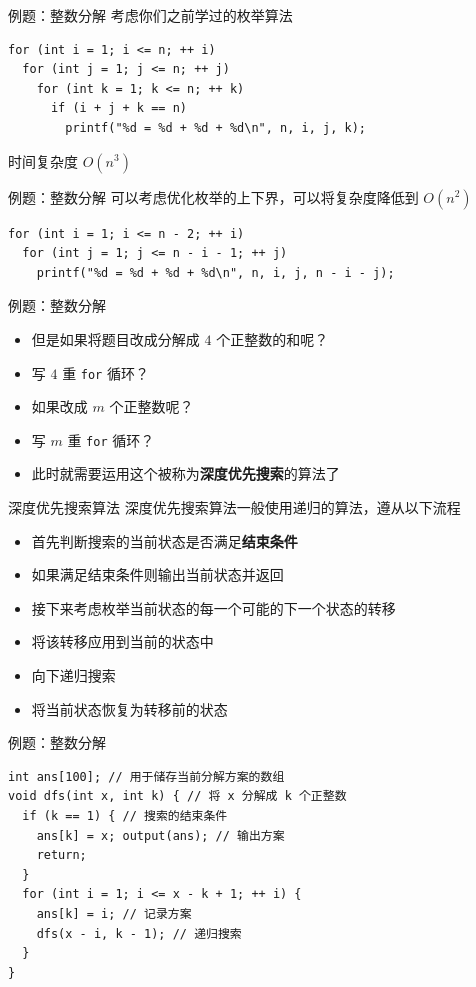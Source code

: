 \documentclass[12pt,aspectratio=169]{beamer}
\begin{document}
\begin{frame}[fragile]{例题：整数分解}
  考虑你们之前学过的枚举算法
  \begin{verbatim}
for (int i = 1; i <= n; ++ i)
  for (int j = 1; j <= n; ++ j)
    for (int k = 1; k <= n; ++ k)
      if (i + j + k == n)
        printf("%d = %d + %d + %d\n", n, i, j, k);
  \end{verbatim}
  \pause
  时间复杂度 $O(n^3)$
\end{frame}

\begin{frame}[fragile]{例题：整数分解}
  可以考虑优化枚举的上下界，可以将复杂度降低到 $O(n^2)$
  \begin{verbatim}
for (int i = 1; i <= n - 2; ++ i)
  for (int j = 1; j <= n - i - 1; ++ j)
    printf("%d = %d + %d + %d\n", n, i, j, n - i - j);
  \end{verbatim}
\end{frame}

\begin{frame}[fragile]{例题：整数分解}
  \begin{itemize}
    \item 但是如果将题目改成分解成 $4$ 个正整数的和呢？\pause
    \item 写 $4$ 重 \verb|for| 循环？\pause
    \item 如果改成 $m$ 个正整数呢？\pause
    \item 写 $m$ 重 \verb|for| 循环？\pause
    \item 此时就需要运用这个被称为\textbf{深度优先搜索}的算法了
  \end{itemize}
\end{frame}

\begin{frame}[fragile]{深度优先搜索算法}
  深度优先搜索算法一般使用递归的算法，遵从以下流程
  \begin{itemize}
    \item 首先判断搜索的当前状态是否满足\textbf{结束条件}
    \item 如果满足结束条件则输出当前状态并返回
    \item 接下来考虑枚举当前状态的每一个可能的下一个状态的转移
    \item 将该转移应用到当前的状态中
    \item 向下递归搜索
    \item 将当前状态恢复为转移前的状态
  \end{itemize}
\end{frame}

\begin{frame}[fragile]{例题：整数分解}
  \begin{verbatim}
int ans[100]; // 用于储存当前分解方案的数组
void dfs(int x, int k) { // 将 x 分解成 k 个正整数
  if (k == 1) { // 搜索的结束条件
    ans[k] = x; output(ans); // 输出方案
    return;
  }
  for (int i = 1; i <= x - k + 1; ++ i) {
    ans[k] = i; // 记录方案
    dfs(x - i, k - 1); // 递归搜索
  }
}
  \end{verbatim}
\end{frame}
\end{document}
